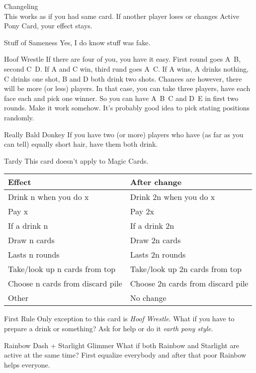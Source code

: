\documentclass[notitlepage]{article}
\begin{document}
Changeling\\
This works as if you had same card. If another player loses or changes Active Pony Card, your effect stays.

Stuff of Sameness\newline
Yes, I do know stuff was fake.

Hoof Wrestle\newline
If there are four of you, you have it easy. First round goes A~B, second C~D. If A and C win, third rund goes A~C. If A wins, A drinks nothing, C drinks one shot, B and D both drink two shots. Chances are however, there will be more (or less) players. In that case, you can take three players, have each face each and pick one winner. So you can have A~B~C and D~E in first two rounds. Make it work somehow. It's probably good idea to pick stating positions randomly.

Really Bald Donkey\newline
If you have two (or more) players who have (as far as you can tell) equally short hair, have them both drink.

Tardy\newline
This card doesn't apply to Magic Cards.\\
\begin{tabular}{| l | l |}
\hline
\textbf{Effect} & \textbf{After change} \\ \hline
Drink n when you do x & Drink 2n when you do x \\ \hline
Pay x & Pay 2x \\ \hline
If a drink n & If a drink 2n \\ \hline
Draw n cards & Draw 2n cards \\ \hline
Lasts n rounds & Lasts 2n rounds \\ \hline
Take/look up n cards from top & Take/look up 2n cards from top \\ \hline
Choose n cards from discard pile & Choose 2n cards from discard pile \\ \hline
Other & No change \\ \hline
\end{tabular}

First Rule\newline
Only exception to this card is \textsl{Hoof Wrestle}. What if you have to prepare a drink or something? Ask for help or do it \textsl{earth pony style}.

Rainbow Dash + Starlight Glimmer\newline
What if both Rainbow and Starlight are active at the same time? First equalize everybody and after that poor Rainbow helps everyone.
\end{document}
